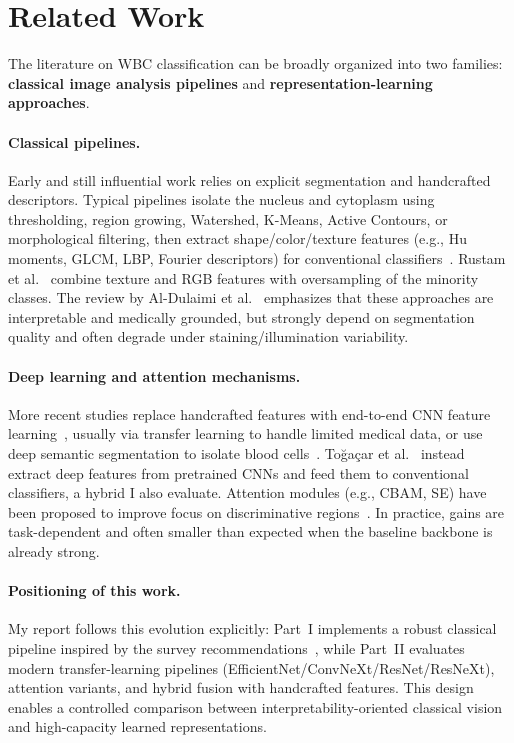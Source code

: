 \documentclass[twocolumn,a4paper]{article}
\begin{document}
\section{Related Work}

The literature on WBC classification can be broadly organized into two families: \textbf{classical image analysis pipelines} and \textbf{representation-learning approaches}.

\paragraph{Classical pipelines.}
Early and still influential work relies on explicit segmentation and handcrafted descriptors. Typical pipelines isolate the nucleus and cytoplasm using thresholding, region growing, Watershed, K-Means, Active Contours, or morphological filtering, then extract shape/color/texture features (e.g., Hu moments, GLCM, LBP, Fourier descriptors) for conventional classifiers~\cite{rezatofighi2011, gautam2014, ghosh2010}. Rustam et al.~\cite{rustam2022} combine texture and RGB features with oversampling of the minority classes. The review by Al-Dulaimi et al.~\cite{aldulaimi2018} emphasizes that these approaches are interpretable and medically grounded, but strongly depend on segmentation quality and often degrade under staining/illumination variability.

\paragraph{Deep learning and attention mechanisms.}
More recent studies replace handcrafted features with end-to-end CNN feature learning~\cite{qin2018}, usually via transfer learning to handle limited medical data, or use deep semantic segmentation to isolate blood cells~\cite{tran2018}. To\u{g}a\c{c}ar et al.~\cite{togacar2020} instead extract deep features from pretrained CNNs and feed them to conventional classifiers, a hybrid I also evaluate. Attention modules (e.g., CBAM, SE) have been proposed to improve focus on discriminative regions~\cite{woo2018cbam, hu2018squeeze}. In practice, gains are task-dependent and often smaller than expected when the baseline backbone is already strong.

\paragraph{Positioning of this work.}
My report follows this evolution explicitly: Part~I implements a robust classical pipeline inspired by the survey recommendations~\cite{aldulaimi2018}, while Part~II evaluates modern transfer-learning pipelines (EfficientNet/ConvNeXt/ResNet/ResNeXt), attention variants, and hybrid fusion with handcrafted features. This design enables a controlled comparison between interpretability-oriented classical vision and high-capacity learned representations.
\end{document}
